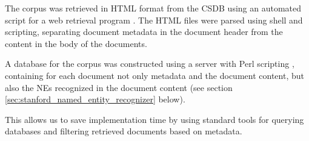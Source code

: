 The corpus was retrieved in HTML format from the CSDB using an automated script for a web retrieval program \cite{wget}. The HTML files were parsed using shell and \citeauthor{python} scripting, separating document metadata in the document header from the content in the body of the documents.

A database for the corpus was constructed using a \citeauthor{MySQL} server with Perl scripting \cite{perl}, containing for each document not only metadata and the document content, but also the NEs recognized in the document content (see section \ref{sec:stanford_named_entity_recognizer} below).

This allows us to save implementation time by using standard tools for querying databases and filtering retrieved documents based on metadata. 
